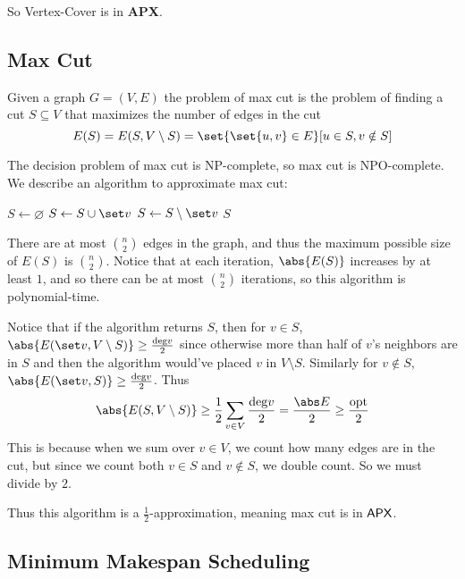 \edefn

So Vertex-Cover is in {\bf APX}.

\subsection{Max Cut}

\bprob

    Given a graph $G=(V,E)$ the problem of {\emphcolor max cut} is the problem of finding a cut $S\subseteq V$ that maximizes the number of edges in the cut
    $$ E(S) = E(S,V\setminus S) = \set{\set{u,v}\in E}[u\in S,v\notin S] $$

\eprob

The decision problem of max cut is NP-complete, so max cut is NPO-complete.
We describe an algorithm to approximate max cut:

\algorithm
        \State $S\gets\varnothing$
                \State $S\gets S\cup\set v$
                \State $S\gets S\setminus\set v$
            \Else
                \State \Return $S$
            \EndIf
        \EndWhile
    \EndFunc
\ealgorithm

There are at most $\binom n2$ edges in the graph, and thus the maximum possible size of $E(S)$ is $\binom n2$.
Notice that at each iteration, $\abs{E(S)}$ increases by at least $1$, and so there can be at most $\binom n2$ iterations, so this algorithm is polynomial-time.

Notice that if the algorithm returns $S$, then for $v\in S$, $\abs{E(\set v,V\setminus S)}\geq\frac{{\rm deg}v}2$ since otherwise more than half of $v$'s neighbors are in $S$ and then the algorithm would've
placed $v$ in $V\setminus S$.
Similarly for $v\notin S$, $\abs{E(\set v,S)}\geq\frac{{\rm deg}v}2$.
Thus
$$ \abs{E(S,V\setminus S)} \geq \frac12\sum_{v\in V}\frac{{\rm deg}v}2 = \frac{\abs E}2 \geq \frac{\rm opt}2 $$
This is because when we sum over $v\in V$, we count how many edges are in the cut, but since we count both $v\in S$ and $v\notin S$, we double count.
So we must divide by $2$.

Thus this algorithm is a $\frac12$-approximation, meaning max cut is in ${\sf APX}$.

\subsection{Minimum Makespan Scheduling}

